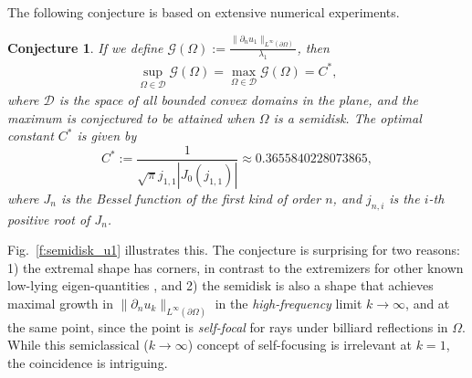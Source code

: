 \documentclass{amsart}
\newcommand{\pO}{{\partial\Omega}}
\theoremstyle{plain}
\newtheorem{conjecture}[theorem]{Conjecture}
\begin{document}
The following conjecture is based on extensive numerical experiments.

\begin{conjecture}\label{conj: semicircle}
If we define $\mathcal{G}(\Omega):=\frac{\|\partial_n u_1\|_{L^{\infty}(\partial\Omega)}}{\lambda_1}$, then
  \begin{align}
    \sup_{\Omega\in\mathcal{D}}\mathcal{G}(\Omega)
    =\max_{\Omega\in\mathcal{D}}\mathcal{G}(\Omega)
    =C^*,
  \end{align}
where $\mathcal{D}$ is the space of all bounded convex domains in the plane, and the maximum is conjectured to be attained when $\Omega$ is a semidisk. The optimal constant $C^*$ is given by
  \[C^*:=\frac{1}{\sqrt{\pi}j_{1,1}|J_0(j_{1,1})|}\approx 0.3655840228073865,\]
where $J_{n}$ is the Bessel function of the first kind of order $n$, and $j_{n,i}$ is the $i$-th positive root of $J_n$.
\end{conjecture}

Fig.~\ref{f:semidisk_u1} illustrates this.
The conjecture is surprising for two reasons:
1) the extremal shape has corners, in contrast to the
extremizers for other known low-lying eigen-quantities
\cite{oudet04,osting10,antunes12},
and
2) the semidisk is also a shape that achieves
maximal growth in $\|\partial_n u_k\|_{L^\infty(\pO)}$ in the
{\em high-frequency} limit $k\to\infty$, and at the same point,
since the point is {\em self-focal} for rays under billiard
reflections in $\Omega$.
While this semiclassical ($k\to\infty$) concept of
self-focusing is irrelevant at $k=1$, the coincidence is intriguing.
\end{document}
